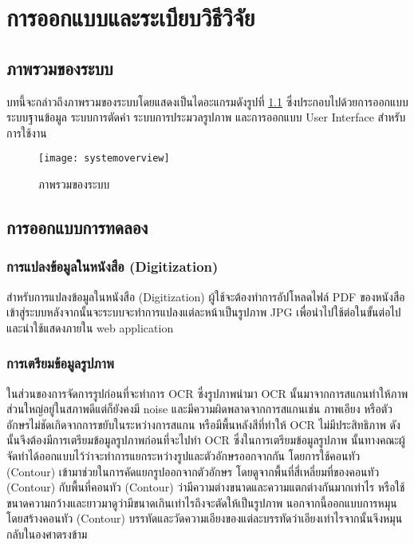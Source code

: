 \chapter{การออกแบบและระเบียบวิธีวิจัย}

\section{ภาพรวมของระบบ}

บทนี้จะกล่าวถึงภาพรวมของระบบโดยแสดงเป็นไดอะแกรมดังรูปที่ \ref{fig:systemoverview} ซึ่งประกอบไปด้วยการออกแบบระบบฐานข้อมูล ระบบการตัดคำ ระบบการประมวลรูปภาพ และการออกแบบ User Interface สำหรับการใช้งาน

\begin{figure}[H]
    \centering
    \texttt{[image: systemoverview]}
    \caption{ภาพรวมของระบบ}\label{fig:systemoverview}
\end{figure}

\section{การออกแบบการทดลอง}
\subsection{การแปลงข้อมูลในหนังสือ (Digitization) }

สำหรับการแปลงข้อมูลในหนังสือ (Digitization) ผู้ใช้จะต้องทำการอัปโหลดไฟล์ PDF ของหนังสือเข้าสู่ระบบหลังจากนั้นจะระบบจะทำการแปลงแต่ละหน้าเป็นรูปภาพ JPG เพื่อนำไปใช้ต่อในขั้นต่อไปและนำใช้แสดงภายใน web application

\subsection{การเตรียมข้อมูลรูปภาพ}

ในส่วนของการจัดการรูปก่อนที่จะทำการ OCR ซึ่งรูปภาพนำมา OCR นั้นมาจากการสแกนทำให้ภาพส่วนใหญ่อยู่ในสภาพดีแต่ก็ยังคงมี noise  และมีความผิดพลาดจากการสแกนเช่น ภาพเอียง
 หรือตัวอักษรไม่ชัดเกิดจากการขยับในระหว่างการสแกน หรือมีพื้นหลังสีที่ทำให้ OCR ไม่มีประสิทธิภาพ ดังนั้นจึงต้องมีการเตรียมข้อมูลรูปภาพก่อนที่จะไปทำ OCR
ซึ่งในการเตรียมข้อมูลรูปภาพ นั้นทางคณะผู้จัดทำได้ออกแบบไว้ว่าจะทำการแยกระหว่างรูปและตัวอักษรออกจากกัน โดยการใช้คอนทัว (Contour) เข้ามาช่วยในการคัดแยกรูปออกจากตัวอักษร 
โดยดูจากพื้นที่สี่เหลี่ยมที่ของคอนทัว (Contour) กับพื้นที่คอนทัว (Contour) ว่ามีความต่างขนาดและความแตกต่างกันมากเท่าไร หรือใช้ขนาดความกว้างและยาวมาดูว่ามีขนาดเกินเท่าไรถึงจะตัดให้เป็นรูปภาพ
นอกจากนี้ออกแบบการหมุนโดยสร้างคอนทัว (Contour) บรรทัดและวัดความเอียงของแต่ละบรรทัดว่าเอียงเท่าไรจากนั้นจึงหมุนกลับในองศาตรงข้าม


